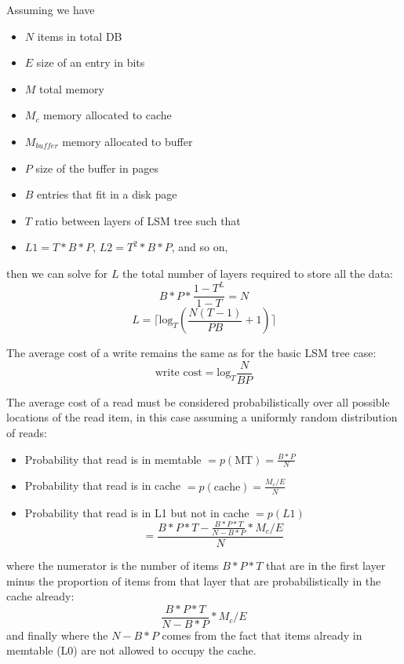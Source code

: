 \documentclass{sig-alternate-05-2015}
\begin{document}
\noindent Assuming we have
\begin{itemize}
\item $N$ items in total DB \\
\item $E$ size of an entry in bits \\
\item $M$ total memory \\
\item $M_c$ memory allocated to cache \\
\item $M_{buffer}$ memory allocated to buffer\\
\item $P$ size of the buffer in pages \\
\item $B$ entries that fit in a disk page \\
\item $T$ ratio between layers of LSM tree such that \\
  \item $L1 = T * B* P$, $L2 =T^2 * B*P $, and so on,
\end{itemize}

\noindent then we can solve for $L$ the total number of layers required to store all the data: \\
$$B*P * \frac{1-T^L}{1-T} = N$$
$$L= \lceil \textrm{log}_{T} \left(\frac{N(T-1)}{PB} + 1\right) \rceil$$


The average cost of a write remains the same as for the basic LSM tree case:
$$
\text{write cost} = \textrm{log}_{T} \frac{N}{BP}
$$

The average cost of a read must be considered probabilistically over all possible locations of the read item, in this case assuming a uniformly random distribution of reads:
\begin{itemize}
\item Probability that read is in memtable $= p(\text{MT}) = \frac{B*P}{N}$
\item Probability that read is in cache $= p(\text{cache}) = \frac{M_c/E}{N}$
\item Probability that read is in L1 but not in cache $= p(L1)$ $$= \frac{B*P * T - \frac{B*P*T}{N-B*P} * M_c/E}{N}$$
\end{itemize}
where the numerator is the number of items $B*P*T$ that are in the first layer minus the proportion of items from that layer that are probabilistically in the cache already: $$\frac{B*P*T}{N-B*P} * M_c/E$$
and finally where the $N-B*P$ comes from the fact that items already in memtable (L0) are not allowed to occupy the cache.
\end{document}
